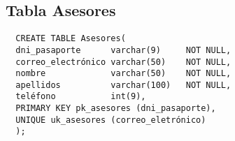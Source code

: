 \subsection{Tabla Asesores}

\begin{verbatim}
  CREATE TABLE Asesores(
  dni_pasaporte      varchar(9)     NOT NULL,
  correo_electrónico varchar(50)    NOT NULL,
  nombre             varchar(50)    NOT NULL,
  apellidos          varchar(100)   NOT NULL,
  teléfono           int(9),
  PRIMARY KEY pk_asesores (dni_pasaporte),
  UNIQUE uk_asesores (correo_eletrónico)
  );
\end{verbatim}